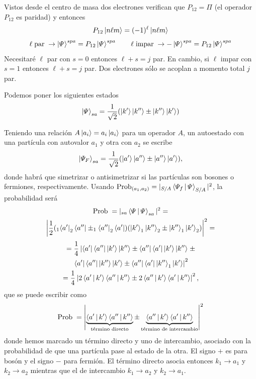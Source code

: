 \documentclass[10pt,oneside]{CBFT_book}
\begin{document}
Vistos desde el centro de masa dos electrones verifican que $ P_{12} = \Pi $ 
(el operador $P_{12}$ es paridad) y entonces
\[
	P_{12}\Ket{n\ell m} = (-1)^\ell \Ket{n\ell m}
\]
\[
	\ell \;\text{par} \; \rightarrow \Ket{\Psi}^{spa} = P_{12} \Ket{\Psi}^{spa} \qquad 
	\ell \;\text{impar} \; \rightarrow -\Ket{\Psi}^{spa} = P_{12} \Ket{\Psi}^{spa}
\]
Necesitaré $\ell$ par con $s=0$ entonces $\ell+s=j$ par. En cambio, si $\ell$ impar con $s=1$ entonces 
$\ell+s=j$ par. Dos electrones sólo se acoplan a momento total $j$ par.

Podemos poner los siguientes estados 
\[
	\Ket{ \Psi }_{sa} = \frac{1}{\sqrt{2}}( \Ket{k'}\Ket{k''} \pm \Ket{k''}\Ket{k'})
\]

Teniendo una relación $A\Ket{a_i} = a_i \Ket{a_i}$ para un operador $A$, 
un autoestado con una partícula con autovalor $a_1$ y otra con $a_2$ se escribe
\[
	\Ket{ \Psi_F }_{sa} = \frac{1}{\sqrt{2}}( \Ket{a'}\Ket{a''} \pm \Ket{a''}\Ket{a'}),
\]
donde habrá que simetrizar o antisimetrizar si las partículas son bosones o fermiones,
respectivamente. Usando $ \text{Prob}_{(a_1,a_2)} = | _{S/A}\Braket{\Psi_f|\Psi}_{S/A} |^2 $,
la probabilidad será
\begin{multline*}
	\text{Prob}\; = |_{sa}\Braket{\Psi|\Psi}_{sa}|^2 =  \\
	\left|\frac{1}{2}(_1\Bra{a'}_2\Bra{a''} \pm _1\Bra{a''}_2\Bra{a'})(\Ket{k'}_1\Ket{k''}_2 \pm 
	\Ket{k''}_1\Ket{k'}_2)\right|^2 =
\end{multline*}
\begin{multline*}
 	= \frac{1}{4}\left| \Bra{a'}\Bra{a''}\Ket{k'}\Ket{k''} \pm \Bra{a''}\Bra{a'}\Ket{k'}\Ket{k''} 
	\right. \pm \\
	\left. \Bra{a'}\Bra{a''}\Ket{k''}\Ket{k'} \pm \Bra{a''}\Bra{a'}\Ket{k''}_1\Ket{k'} \right|^2 \\
	= \frac{1}{4}\left| 2\Braket{a'|k'}\Braket{a''|k''} \pm 2\Braket{a''|k'}\Braket{a'|k''}\right|^2, 
\end{multline*}
que se puede escribir como
\[
	\text{Prob}\; = \left| \underbrace{\Braket{a'|k'}\Braket{a''|k''}}_{\text{término directo}} \pm 
	\underbrace{\Braket{a''|k'}\Braket{a'|k''}}_\text{término de intercambio}\right|^2
\]
donde hemos marcado un término directo y uno de intercambio, asociado con la probabilidad de que una
partícula pase al estado de la otra. El signo $+$ es para bosón y el signo $-$ para fermión. El término 
directo asocia entonces $k_1 \to a_1$ y $k_2 \to a_2$ mientras que el de intercambio $k_1 \to a_2$ y 
$k_2 \to a_1$.
\end{document}
